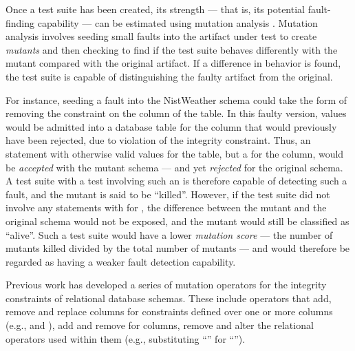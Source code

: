 Once a test suite has been created, its strength --- that is, its potential fault-finding capability --- can be estimated using mutation analysis \cite{Jia2011}. Mutation analysis involves seeding small faults into the artifact under test to create {\it mutants} and then checking to find if the test suite behaves differently with the mutant compared with the original artifact. If a difference in behavior is found, the test suite is capable of distinguishing the faulty artifact from the original.


For instance, seeding a fault into the NistWeather schema could take the form of removing the \NOTNULL constraint on the  column of the  table. In this faulty version, \NULL values would be admitted into a database table for the  column that would previously have been rejected, due to violation of the integrity constraint. Thus, an \INSERT statement with otherwise valid values for the  table, but a \NULL for the  column, would be {\it accepted} with the mutant schema --- and yet {\it rejected} for the original schema. A test suite with a test involving such an \INSERT is therefore capable of detecting such a fault, and the mutant is said to be ``killed''. However, if the test suite did not involve any \INSERT statements with \NULL for , the difference between the mutant and the original schema would not be exposed, and the mutant would still be classified as ``alive''. Such a test suite would have a lower {\it mutation score} --- the number of mutants killed divided by the total number of mutants --- and would therefore be regarded as having a weaker fault detection capability.

Previous work \cite{Kapfhammer2013,Wright2013,Wright2014} has developed a series of mutation operators for the integrity constraints of relational database schemas. These include operators that add, remove and replace columns for constraints defined over one or more columns (e.g., \PK and \FKCs), add and remove \NNCs for columns, remove \CCs and alter the relational operators used within them (e.g., substituting ``\sql{>}'' for ``\sql{>=}'').

